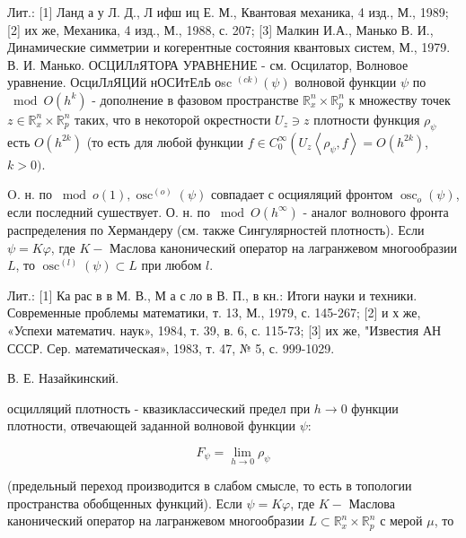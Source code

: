 \documentclass[10pt]{article}
\begin{document}
Лит.: [1] Ланд а у Л. Д., Л ифш иц Е. М., Квантовая механика, 4 изд., М., 1989; [2] их же, Механика, 4 изд., М., 1988, с. 207; [3] Малкин И.А., Манько В. И., Динамические симметрии и когерентные состояния квантовых систем, М., 1979. В. И. Манько. ОСЦИЛлЯТОРА УРАВНЕНИЕ - см. Осцилатор, Волновое уравнение. ОсциЛлЯЦИй нОСИтЕлЬ оsc ${ }^{(c k)}(\psi)$ волновой функции $\psi$ по $\bmod O\left(h^{k}\right)$ - дополнение в фазовом пространстве $\mathbb{R}_{x}^{n} \times \mathbb{R}_{p}^{n}$ к множеству точек $z \in \mathbb{R}_{x}^{n} \times \mathbb{R}_{p}^{n}$ таких, что в некоторой окрестности $U_{z} \ni z$ плотности функция $\rho_{\psi}$ есть $O\left(h^{2 k}\right)$ (то есть для любой функции $f \in C_{0}^{\infty}\left(U_{z}\left\langle\rho_{\psi}, f\right\rangle=O\left(h^{2 k}\right)\right.$, $k>0)$.



O. н. по $\bmod o(1), \operatorname{osc}^{(o)}(\psi)$ совпадает с осцияляций фронтом $\operatorname{osc}_{o}(\psi)$, если последний сушествует. О. н. по $\bmod O\left(h^{\infty}\right)$ - аналог волнового фронта распределения по Хермандеру (см. также Сингулярностей плотность). Если $\psi=K \varphi$, где $K-$ Маслова канонический оператор на лагранжевом многообразии $L$, то $\operatorname{osc}^{(l)}(\psi) \subset L$ при любом $l$.



Лит.: [1] Ка рас в в М. В., М а с ло в В. П., в кн.: Итоги науки и техники. Современные проблемы математики, т. 13, М., 1979, с. 145-267; [2] и х же, «Успехи математич. наук», 1984, т. 39, в. 6, с. 115-73; [3] их же, "Известия АН СССР. Сер. математическая», 1983, т. 47, № 5, с. 999-1029.



В. Е. Назайкинский.



осцилляций плотность - квазиклассический предел при $h \rightarrow 0$ функции плотности, отвечающей заданной волновой функции $\psi:$



\[

F_{\psi}=\lim _{h \rightarrow 0} \rho_{\psi}

\]



(предельный переход производится в слабом смысле, то есть в топологии пространства обобщенных функций). Если $\psi=K \varphi$, где $K-$ Маслова канонический оператор на лагранжевом многообразии $L \subset \mathbb{R}_{x}^{n} \times \mathbb{R}_{p}^{n}$ с мерой $\mu$, то
\end{document}
